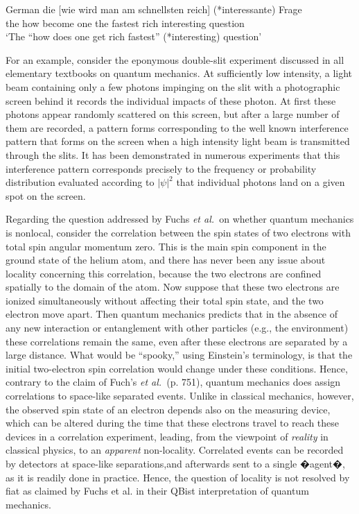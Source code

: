 \documentclass[prb,preprint]{revtex4-1}
\begin{document}
      \ea\label{ex:t6b}
      German
      \gll die [wie wird man am schnellsten reich] (*interessante) Frage \\
            the  how become one the fastest   rich	interesting   question\\
      \glt	`The ``how does one get rich fastest'' (*interesting) question'
      \z
     




For an example, consider the eponymous double-slit experiment discussed in all elementary textbooks on quantum mechanics.  At sufficiently low intensity, a light beam containing only a few photons impinging on the slit with a photographic screen behind it records the individual impacts of these photon.  At  first these photons appear randomly scattered on this screen, but after a large number  of them are recorded, a pattern forms corresponding to the well known interference pattern that forms on the screen when a high intensity light beam is  transmitted through the slits.  It has been demonstrated in numerous experiments that this interference pattern corresponds precisely to the frequency or probability distribution evaluated according to $|\psi|^2$  that individual photons land on a given spot on the screen.

Regarding the question addressed by Fuchs {\it et al.\ }on whether quantum mechanics is nonlocal, consider the correlation between the spin states of two electrons with total spin angular momentum zero.  This is the main spin component 
in the ground state of the helium atom, and there has never been  any issue about locality concerning this correlation,  because the two electrons are confined spatially to the domain of the atom. Now suppose that these two electrons are ionized simultaneously without affecting their total spin state, and the two electron move apart. Then quantum mechanics predicts that in the absence of any new interaction or entanglement with other particles (e.g., the environment) these  correlations remain the same, even after these electrons are separated by a large distance.  What would  be ``spooky,'' using Einstein's terminology, is that the initial two-electron spin correlation would change under these conditions.  Hence, contrary to the claim of Fuch's {\it et al.\ }(p. 751), quantum mechanics  does  assign correlations to space-like separated events. Unlike in classical mechanics, however,  the observed spin state of an  electron depends also on the measuring device, which can be altered during the time that these electrons travel to  reach these devices in a correlation
experiment, leading, from the viewpoint of  {\it reality} in classical physics,  to an  {\it apparent} non-locality. Correlated events can be recorded by detectors at space-like separations,and afterwards sent to a single �agent�, as it is readily done in
practice. Hence, the question of locality is not resolved by fiat as  claimed by Fuchs et al. in their QBist interpretation of quantum mechanics.
\end{document}
